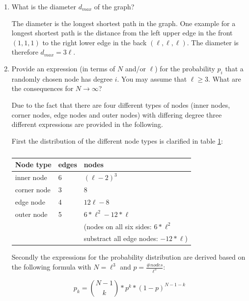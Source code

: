 \begin{enumerate}
	\item What is the diameter $d_{max}$ of the graph?
	\vspace{0.25cm}
	
	The diameter is the longest shortest path in the graph. One example for a longest shortest path is the distance from the left upper edge in the front $(1,1,1)$ to the right lower edge in the back $(\ell,\ell,\ell)$. The diameter is therefore $d_{max} = 3\ell$.
	
	\item Provide an expression (in terms of $N$ and/or $\ell$) for the probability $p_i$ that a randomly chosen node has degree $i$. You may assume that $\ell \geq 3$. What are the consequences for $N \rightarrow \infty$?
	\vspace{0.25cm}
	
	Due to the fact that there are four different types of nodes (inner nodes, corner nodes, edge nodes and outer nodes) with differing degree three different expressions are provided in the following.
	
	\newpage
	
	First the distribution of the different node types is clarified in table \ref{tab:node_distribution}:
	
	\begin{table}[h]
	\centering
	\begin{tabular}{l|l|l}
		\hline
		\rowcolor{lightgray}
		Node type & edges & nodes \\ 
		\hline
		inner node    & 6 & $(\ell-2)^3$ \\
		\hline
		corner node    & 3 & $8$ \\
		\hline
		edge node    & 4  & $12 \ell - 8$ \\
		\hline
		outer node    & 5  & $6*\ell^2 - 12*\ell$ \\
		& & (nodes on all six sides: $6*\ell^2$ \\
		& & substract all edge nodes: $-12*\ell$) \\
		\hline
	\end{tabular}
	\caption{}
	\label{tab:node_distribution}
	\end{table}

	Secondly the expressions for the probability distribution are derived based on the following formula with $N=\ell^3$ and $p=\frac{\#nodes}{\ell^3}$:
	
	\begin{equation}
	p_k = {{N-1}\choose{k}} * p^k * (1-p)^{N-1-k}
	\end{equation}
	

\end{enumerate}
